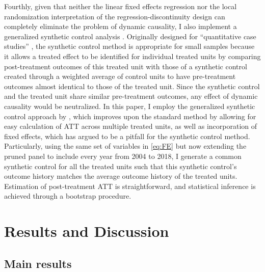\documentclass[12pt]{article}\usepackage[]{graphicx}\usepackage[]{color}
\newcommand{\1}{\mathbbm{1}}
\begin{document}
Fourthly, given that neither the linear fixed effects regression nor the local randomization interpretation of the regression-discontinuity design can completely eliminate the problem of dynamic causality, I also implement a generalized synthetic control analysis \citep{Xu2017gsynth}. Originally designed for ``quantitative case studies'' \cite{Abadie2010, Abadie2015}, the synthetic control method is appropriate for small samples because it allows a treated effect to be identified for individual treated units by comparing post-treatment outcomes of this treated unit with those of a synthetic control created through a weighted average of control units to have pre-treatment outcomes almost identical to those of the treated unit. Since the synthetic control and the treated unit share similar pre-treatment outcomes, any effect of dynamic causality would be neutralized. In this paper, I employ the generalized synthetic control approach by \citet{Xu2017gsynth}, which improves upon the standard method by allowing for easy calculation of ATT across multiple treated units, as well as incorporation of fixed effects, which \citet{ImaiKim2012} has argued to be a pitfall for the synthetic control method. Particularly, using the same set of variables in \ref{eq:FE} but now extending the pruned panel to include every year from 2004 to 2018, I generate a common synthetic control for all the treated units such that this synthetic control's outcome history matches the average outcome history of the treated units. Estimation of post-treatment ATT is straightforward, and statistical inference is achieved through a bootstrap procedure.


\section{Results and Discussion}
\label{sec:results}

\subsection{Main results}

\end{document}
